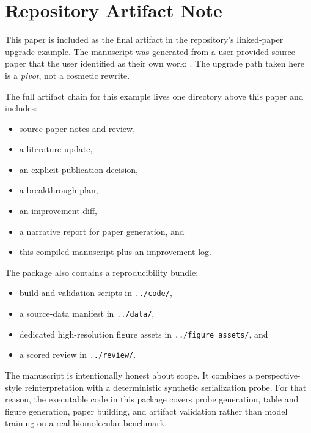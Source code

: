 \section{Repository Artifact Note}

This paper is included as the final artifact in the repository's linked-paper upgrade example. The manuscript was generated from a user-provided source paper that the user identified as their own work: \citet{corcoran2018spatial}. The upgrade path taken here is a \emph{pivot}, not a cosmetic rewrite.

The full artifact chain for this example lives one directory above this paper and includes:
\begin{itemize}[leftmargin=1.4em]
  \item source-paper notes and review,
  \item a literature update,
  \item an explicit publication decision,
  \item a breakthrough plan,
  \item an improvement diff,
  \item a narrative report for paper generation, and
  \item this compiled manuscript plus an improvement log.
\end{itemize}

The package also contains a reproducibility bundle:
\begin{itemize}[leftmargin=1.4em]
  \item build and validation scripts in \texttt{../code/},
  \item a source-data manifest in \texttt{../data/},
  \item dedicated high-resolution figure assets in \texttt{../figure\_assets/}, and
  \item a scored review in \texttt{../review/}.
\end{itemize}

The manuscript is intentionally honest about scope. It combines a perspective-style reinterpretation with a deterministic synthetic serialization probe. For that reason, the executable code in this package covers probe generation, table and figure generation, paper building, and artifact validation rather than model training on a real biomolecular benchmark.
